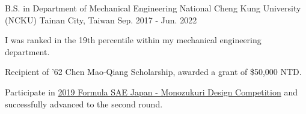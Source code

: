 

\begin{cventries}

  \cventry
    {B.S. in Department of Mechanical Engineering} %
    {National Cheng Kung University (NCKU)} %
    {Tainan City, Taiwan} %
    {Sep. 2017 - Jun. 2022} %
    {
      \begin{cvitems} %
        \item {I was ranked in the 19th percentile within my mechanical engineering department.}
        \item {Recipient of '62 Chen Mao-Qiang Scholarship, awarded a grant of \$50,000 NTD.}
        \item {Participate in \href {https://www.jsae.or.jp/formula2/en/17th/eventoutline.php}{2019 Formula SAE Japan - Monozukuri Design Competition} and successfully advanced to the second round.}
      \end{cvitems}
    }

\end{cventries}
